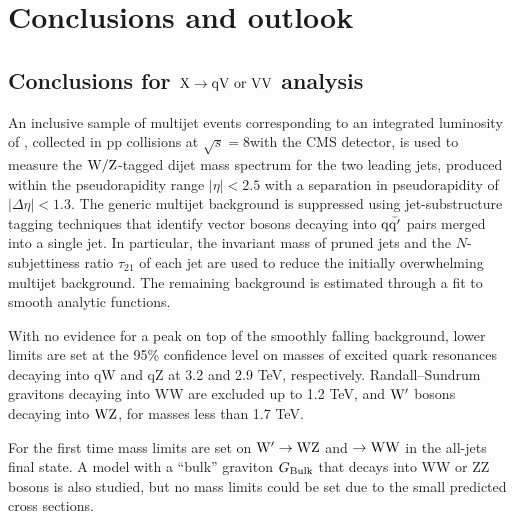 \chapter{Conclusions and outlook}
\label{sec:conclusions1}


\section{Conclusions for ${\rm X \to qV~or~VV}$ analysis}

An inclusive sample of multijet events corresponding to an integrated
luminosity of \intlumi, collected in pp collisions at
$\sqrt{s}=8$\TeVcc with the CMS detector, is used to measure the
${\rm W}/{\rm Z}$-tagged dijet mass spectrum for the two leading jets,
produced within the pseudorapidity range $|{\eta}| < 2.5$ with a
separation in pseudorapidity of $|{\Delta\eta}| < 1.3$. The generic
multijet background is suppressed using jet-substructure tagging
techniques that identify vector bosons decaying into ${\rm q\bar{q'}}$ pairs
merged into a single jet. In particular, the invariant mass of pruned
jets and the $N$-subjettiness ratio $\tau_{21}$ of each jet are used
to reduce the initially overwhelming multijet background. The
remaining background is estimated through a fit to smooth analytic
functions. 

With no evidence for a peak on top of the smoothly falling
background, lower limits are set at the 95\% confidence level on
masses of excited quark resonances decaying into qW and qZ at 3.2 and
2.9 TeV, respectively. Randall--Sundrum gravitons \GRS decaying into
WW are excluded up to 1.2 TeV, and $\mathrm{W}^{\prime}$ bosons decaying into
${\rm W}{\rm Z}$, for masses less than 1.7 TeV.  

For the first time mass
limits are set on $\mathrm{W}^{\prime}\to {\rm W}{\rm Z}$ and \GRS $\to {\rm W}{\rm W}$ in the
all-jets final state. 
A model with a ``bulk'' graviton $G_\mathrm{Bulk}$ that decays into
WW or ZZ bosons is also studied, but no mass limits could be set due
to the small predicted cross sections.

